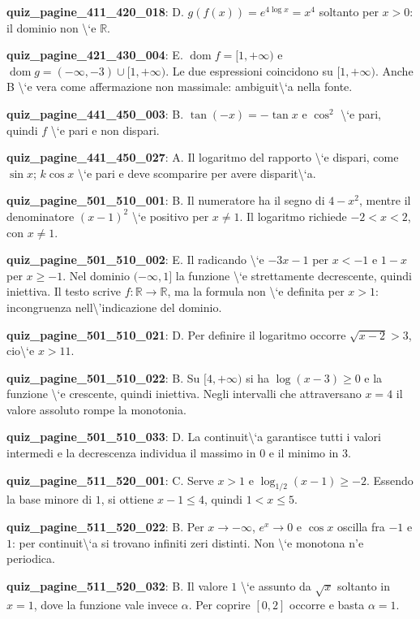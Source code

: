\documentclass[11pt,a4paper]{article}
\newcounter{quiz}
\begin{document}
\noindent\textbf{quiz\_pagine\_411\_420\_018}: D. $g(f(x))=e^{4\log x}=x^4$ soltanto per $x>0$: il dominio non \textbackslash{}`e $\mathbb R$.\par\medskip
\noindent\textbf{quiz\_pagine\_421\_430\_004}: E. $\operatorname{dom}f=[1,+\infty)$ e $\operatorname{dom}g=(-\infty,-3)\cup[1,+\infty)$. Le due espressioni coincidono su $[1,+\infty)$. Anche B \textbackslash{}`e vera come affermazione non massimale: ambiguit\textbackslash{}`a nella fonte.\par\medskip
\noindent\textbf{quiz\_pagine\_441\_450\_003}: B. $\tan(-x)=-\tan x$ e $\cos^2$ \textbackslash{}`e pari, quindi $f$ \textbackslash{}`e pari e non dispari.\par\medskip
\noindent\textbf{quiz\_pagine\_441\_450\_027}: A. Il logaritmo del rapporto \textbackslash{}`e dispari, come $\sin x$; $k\cos x$ \textbackslash{}`e pari e deve scomparire per avere disparit\textbackslash{}`a.\par\medskip
\noindent\textbf{quiz\_pagine\_501\_510\_001}: B. Il numeratore ha il segno di $4-x^2$, mentre il denominatore $(x-1)^2$ \textbackslash{}`e positivo per $x\ne1$. Il logaritmo richiede $-2<x<2$, con $x\ne1$.\par\medskip
\noindent\textbf{quiz\_pagine\_501\_510\_002}: E. Il radicando \textbackslash{}`e $-3x-1$ per $x<-1$ e $1-x$ per $x\ge-1$. Nel dominio $(-\infty,1]$ la funzione \textbackslash{}`e strettamente decrescente, quindi iniettiva. Il testo scrive $f:\mathbb R\to\mathbb R$, ma la formula non \textbackslash{}`e definita per $x>1$: incongruenza nell\textbackslash{}'indicazione del dominio.\par\medskip
\noindent\textbf{quiz\_pagine\_501\_510\_021}: D. Per definire il logaritmo occorre $\sqrt{x-2}>3$, cio\textbackslash{}`e $x>11$.\par\medskip
\noindent\textbf{quiz\_pagine\_501\_510\_022}: B. Su $[4,+\infty)$ si ha $\log(x-3)\ge0$ e la funzione \textbackslash{}`e crescente, quindi iniettiva. Negli intervalli che attraversano $x=4$ il valore assoluto rompe la monotonia.\par\medskip
\noindent\textbf{quiz\_pagine\_501\_510\_033}: D. La continuit\textbackslash{}`a garantisce tutti i valori intermedi e la decrescenza individua il massimo in $0$ e il minimo in $3$.\par\medskip
\noindent\textbf{quiz\_pagine\_511\_520\_001}: C. Serve $x>1$ e $\log_{1/2}(x-1)\ge-2$. Essendo la base minore di $1$, si ottiene $x-1\le4$, quindi $1<x\le5$.\par\medskip
\noindent\textbf{quiz\_pagine\_511\_520\_022}: B. Per $x\to-\infty$, $e^x\to0$ e $\cos x$ oscilla fra $-1$ e $1$: per continuit\textbackslash{}`a si trovano infiniti zeri distinti. Non \textbackslash{}`e monotona n'e periodica.\par\medskip
\noindent\textbf{quiz\_pagine\_511\_520\_032}: B. Il valore $1$ \textbackslash{}`e assunto da $\sqrt{x}$ soltanto in $x=1$, dove la funzione vale invece $\alpha$. Per coprire $[0,2]$ occorre e basta $\alpha=1$.\par\medskip
\end{document}
